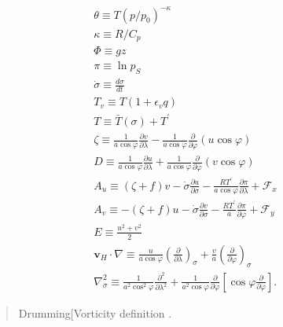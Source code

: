 \begin{eqnarray}
\theta  \equiv  T \left( p/p_{0} \right)^{-\kappa} \\
\kappa  \equiv  R/C_{p} \\
  \Phi  \equiv  gz \\
   \pi  \equiv  \ln p_{S} \\
%
 \dot{\sigma}  \equiv   \frac{d \sigma}{d t} \\
%
     T_v  \equiv  T ( 1+\epsilon_v q ) \\
     T  \equiv   \bar{T}(\sigma) + T^{\prime} \\
%
 \zeta  \equiv  \frac{1}{a \cos\varphi }
                    \frac{\partial v}{\partial \lambda}
             -    \frac{1}{a \cos\varphi }
                    \frac{\partial }{\partial \varphi}
                    ( u \cos\varphi ) \\
%
     D  \equiv  \frac{1}{a \cos\varphi }
                    \frac{\partial u}{\partial \lambda}
             +    \frac{1}{a \cos\varphi }
                    \frac{\partial }{\partial \varphi}
                    ( v \cos\varphi ) \\
%
    A_u  \equiv   ( \zeta + f ) v
             - \dot{\sigma} \frac{\partial u}{\partial \sigma}
             - \frac{RT^{\prime}}{a\cos\varphi}
                  \frac{\partial \pi}{\partial \lambda}
             + {\mathcal F}_x \\
%
    A_v  \equiv  - ( \zeta + f ) u
             - \dot{\sigma} \frac{\partial v}{\partial \sigma}
             - \frac{RT^{\prime}}{a}
                  \frac{\partial \pi}{\partial \varphi}
             + {\mathcal F}_y \\
%
     E  \equiv   \frac{u^{2}+v^{2}}{2} \\
%
 \mathbf{v}_{H} \cdot \nabla
        \equiv  \frac{u}{a \cos \varphi}
         \left( \frac{\partial }{\partial \lambda} \right)_{\sigma}
     + \frac{v}{a}
         \left( \frac{\partial }{\partial \varphi} \right)_{\sigma}
            \\
  \nabla^{2}_{\sigma}  
        \equiv  
               \frac{1}{a^{2}\cos^2\varphi}
                 \frac{\partial^{2} }{\partial \lambda^{2}}
             + \frac{1}{a^{2}\cos\varphi}
                 \frac{\partial }{\partial \varphi}
                 \left[ \cos\varphi
                       \frac{\partial }{\partial \varphi} \right]  .
\end{eqnarray}

\begin{quote}
\protect\hypertarget{Vorticityux20definition}{}{Drumming{[}Vorticity
definition }.
\end{quote}


